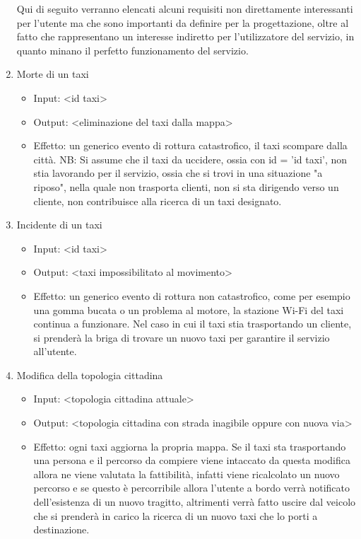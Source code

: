 \begin{enumerate}
	Qui di seguito verranno elencati alcuni requisiti non direttamente interessanti per l'utente ma che sono importanti da definire per la progettazione, oltre al fatto che rappresentano un interesse indiretto per l'utilizzatore del servizio, in quanto minano il perfetto funzionamento del servizio.

	\item Morte di un taxi
		\begin{itemize}
			\item Input: <id taxi>
			\item Output: <eliminazione del taxi dalla mappa>
			\item Effetto: un generico evento di rottura catastrofico, il taxi scompare dalla città. NB: Si assume che il taxi da uccidere, ossia con id = 'id taxi', non stia lavorando per il servizio, ossia che si trovi in una situazione "a riposo", nella quale non trasporta clienti, non si sta dirigendo verso un cliente, non contribuisce alla ricerca di un taxi designato.
		\end{itemize}
	
	\item Incidente di un taxi
	\begin{itemize}
		\item Input: <id taxi>
		\item Output: <taxi impossibilitato al movimento>
		\item Effetto: un generico evento di rottura non catastrofico, come per esempio una gomma bucata o un problema al motore, la stazione Wi-Fi del taxi continua a funzionare. Nel caso in cui il taxi stia trasportando un cliente, si prenderà la briga di trovare un nuovo taxi per garantire il servizio all'utente.
	\end{itemize}

	\item Modifica della topologia cittadina
		\begin{itemize}
			\item Input: <topologia cittadina attuale>
			\item Output: <topologia cittadina con strada inagibile oppure con nuova via>
			\item Effetto: ogni taxi aggiorna la propria mappa. Se il taxi sta trasportando una persona e il percorso da compiere viene intaccato da questa modifica allora ne viene valutata la fattibilità, infatti viene ricalcolato un nuovo percorso e se questo è percorribile allora l'utente a bordo verrà notificato dell'esistenza di un nuovo tragitto, altrimenti verrà fatto uscire dal veicolo che si prenderà in carico la ricerca di un nuovo taxi che lo porti a destinazione.
		\end{itemize}

\end{enumerate}

